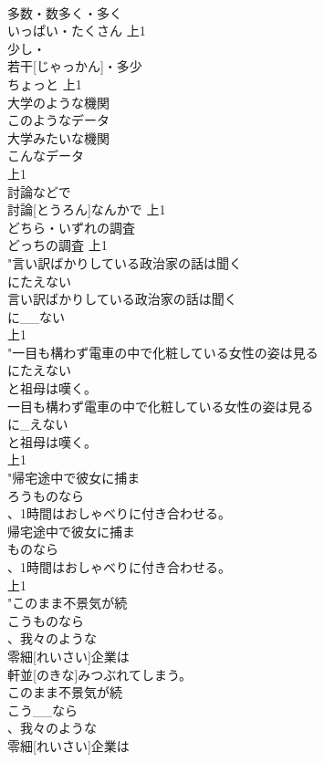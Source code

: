 \documentclass[8pt]{extreport}
\begin{document}
\begin{CJK}{UTF8}{min}
\\	多数・数多く・多く	
\\	いっぱい・たくさん			上1
\\	少し・
\\	若干[じゃっかん]・多少	
\\	ちょっと			上1
\\	大学のような機関
\\	このようなデータ
\\	大学みたいな機関
\\	こんなデータ
\\	上1
\\	討論などで	
\\	討論[とうろん]なんかで			上1
\\	どちら・いずれの調査	
\\	どっちの調査			上1
\\	"言い訳ばかりしている政治家の話は聞く
\\	にたえない
\\	言い訳ばかりしている政治家の話は聞く
\\	に__ない
\\	上1
\\	"一目も構わず電車の中で化粧している女性の姿は見る
\\	にたえない
\\	と祖母は嘆く。
\\	一目も構わず電車の中で化粧している女性の姿は見る
\\	に_えない
\\	と祖母は嘆く。
\\	上1
\\	"帰宅途中で彼女に捕ま
\\	ろうものなら
\\	、1時間はおしゃべりに付き合わせる。
\\	帰宅途中で彼女に捕ま
\\	ものなら
\\	、1時間はおしゃべりに付き合わせる。
\\	上1
\\	"このまま不景気が続
\\	こうものなら
\\	、我々のような
\\	零細[れいさい]企業は
\\	軒並[のきな]みつぶれてしまう。
\\	このまま不景気が続
\\	こう__なら
\\	、我々のような
\\	零細[れいさい]企業は

\end{CJK}
\end{document}
